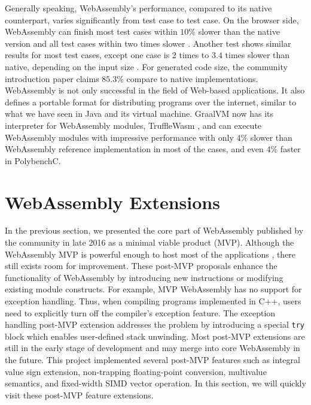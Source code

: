 Generally speaking, WebAssembly's performance, compared to its native
counterpart, varies significantly from test case to test case. On the browser
side, WebAssembly can finish most test cases within $10\%$ slower than the
native version and all test cases within two times slower
\cite{10.1145/3062341.3062363}. Another test shows similar results for most
test cases, except one case is 2 times to $3.4$ times slower than native,
depending on the input size \cite{234914}. For generated code size, the
community introduction paper claims $85.3\%$ compare to native implementations.
WebAssembly is not only successful in the field of Web-based applications. It
also defines a portable format for distributing programs over the internet,
similar to what we have seen in Java and its virtual machine. GraalVM now has
its interpreter for WebAssembly modules, TruffleWasm \cite{trufflewasm}, and can
execute WebAssembly modules with impressive performance with only $4\%$ slower
than WebAssembly reference implementation in most of the cases, and even $4\%$
faster in PolybenchC.

\section{WebAssembly Extensions}

In the previous section, we presented the core part of WebAssembly published by
the community in late 2016 as a minimal viable product (MVP). Although the
WebAssembly MVP is powerful enough to host most of the applications
\cite{webassembly-survey}, there still exists room for improvement. These
post-MVP proposals enhance the functionality of WebAssembly by introducing new
instructions or modifying existing module constructs. For example, MVP
WebAssembly has no support for exception handling. Thus, when compiling programs
implemented in C++, users need to explicitly turn off the compiler's exception
feature. The exception handling post-MVP extension addresses the
problem by introducing a special \texttt{try} block which enables user-defined
stack unwinding. Most post-MVP extensions are still in the early stage of
development and may merge into core WebAssembly in the future. This project
implemented several post-MVP features such as integral value sign extension,
non-trapping floating-point conversion, multivalue semantics, and fixed-width
SIMD vector operation. In this section, we will quickly visit these post-MVP
feature extensions.

